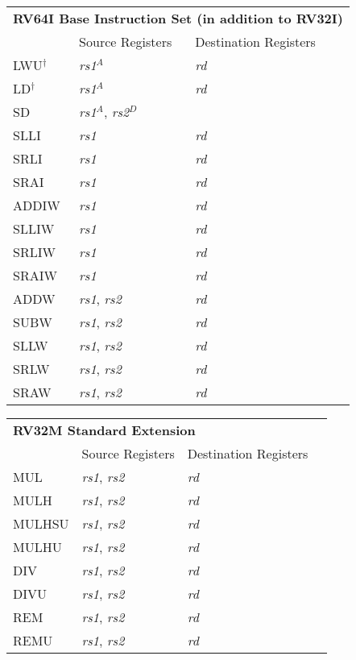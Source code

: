 \begin{tabular}{p{25mm}|p{3cm}|p{6cm}|p{10cm}}
  \multicolumn{4}{l}{\bf RV64I Base Instruction Set (in addition to RV32I)} \\
  \cline{2-3}
   & Source Registers & Destination Registers \\
  \cline{2-3}
   LWU$^\dagger$ & {\em rs1}$^A$ & {\em rd} &  \\
   \cline{2-3}
   LD$^\dagger$ & {\em rs1}$^A$ & {\em rd} &  \\
   \cline{2-3}
   SD & {\em rs1}$^A$, {\em rs2}$^D$ &  &  \\
   \cline{2-3}
   SLLI & {\em rs1} & {\em rd} &  \\
   \cline{2-3}
   SRLI & {\em rs1} & {\em rd} &  \\
   \cline{2-3}
   SRAI & {\em rs1} & {\em rd} &  \\
   \cline{2-3}
   ADDIW & {\em rs1} & {\em rd} &  \\
   \cline{2-3}
   SLLIW & {\em rs1} & {\em rd} &  \\
   \cline{2-3}
   SRLIW & {\em rs1} & {\em rd} &  \\
   \cline{2-3}
   SRAIW & {\em rs1} & {\em rd} &  \\
   \cline{2-3}
   ADDW & {\em rs1}, {\em rs2} & {\em rd} &  \\
   \cline{2-3}
   SUBW & {\em rs1}, {\em rs2} & {\em rd} &  \\
   \cline{2-3}
   SLLW & {\em rs1}, {\em rs2} & {\em rd} &  \\
   \cline{2-3}
   SRLW & {\em rs1}, {\em rs2} & {\em rd} &  \\
   \cline{2-3}
   SRAW & {\em rs1}, {\em rs2} & {\em rd} &  \\
   \cline{2-3}
\end{tabular}

\begin{tabular}{p{25mm}|p{3cm}|p{6cm}|p{10cm}}
  \multicolumn{4}{l}{\bf RV32M Standard Extension} \\
  \cline{2-3}
   & Source Registers & Destination Registers \\
  \cline{2-3}
   MUL & {\em rs1}, {\em rs2} & {\em rd} &  \\
   \cline{2-3}
   MULH & {\em rs1}, {\em rs2} & {\em rd} &  \\
   \cline{2-3}
   MULHSU & {\em rs1}, {\em rs2} & {\em rd} &  \\
   \cline{2-3}
   MULHU & {\em rs1}, {\em rs2} & {\em rd} &  \\
   \cline{2-3}
   DIV & {\em rs1}, {\em rs2} & {\em rd} &  \\
   \cline{2-3}
   DIVU & {\em rs1}, {\em rs2} & {\em rd} &  \\
   \cline{2-3}
   REM & {\em rs1}, {\em rs2} & {\em rd} &  \\
   \cline{2-3}
   REMU & {\em rs1}, {\em rs2} & {\em rd} &  \\
   \cline{2-3}
\end{tabular}

